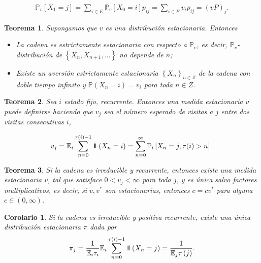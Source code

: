 \documentclass{article}
\newtheorem{Teo}{Teorema}[section]
\newtheorem{Cor}{Corolario}[section]
\newcommand{\esp}{\mathbb{E}}
\newcommand{\prob}{\mathbb{P}}
\newcommand{\indora}{\mbox{$1$\hspace{-0.8ex}$1$}}
\numberwithin{equation}{section}
\begin{document}
\begin{eqnarray}
\prob_{v}\left[X_{1}=j\right]=\sum_{i\in E}\prob_{v}\left[X_{0}=i\right]p_{ij}=\sum_{i\in E}v_{i}p_{ij}=\left(vP\right)_{j}.
\end{eqnarray}

\begin{Teo}
Supongamos que $v$ es una distribuci\'on estacionaria. Entonces
\begin{itemize}
\item[i)] La cadena es estrictamente estacionaria con respecto a
$\prob_{v}$, es decir, $\prob_{v}$-distribuci\'on de $\left\{X_{n},X_{n+1},\ldots\right\}$ no depende de $n$;
\item[ii)] Existe un aversi\'on estrictamente estacionaria $\left\{X_{n}\right\}_{n\in Z}$ de la cadena con doble tiempo infinito y $\prob\left(X_{n}=i\right)=v_{i}$ para toda $n\in Z$.
\end{itemize}
\end{Teo}

\begin{Teo}
Sea $i$ estado fijo, recurrente. Entonces una medida estacionaria $v$ puede definirse haciendo que $v_{j}$ sea el n\'umero esperado de visitas a $j$ entre dos visitas consecutivas $i$,

\begin{equation}\label{Eq.3.1}
v_{j}=\esp_{i}\sum_{n=0}^{\tau(i)-1}\indora\left(X_{n}=i\right)=\sum_{n=0}^{\infty}\prob_{i}\left[X_{n}=j,\tau(i)>n\right].
\end{equation}
\end{Teo}

\begin{Teo}\label{Teo.3.3}
Si la cadena es irreducible y recurrente, entonces existe una medida estacionaria $v$, tal que satisface $0<v_{j}<\infty$ para toda $j$, y es \'unica salvo factores multiplicativos, es decir, si $v,v^{*}$ son estacionarias, entonces $c=cv^{*}$ para alguna $c\in\left(0,\infty\right)$.
\end{Teo}

\begin{Cor}\label{Cor.3.5}
Si la cadena es irreducible y positiva recurrente, existe una \'unica distribuci\'on estacionaria $\pi$ dada por
\begin{equation}
\pi_{j}=\frac{1}{\esp_{i}\tau_{i}}\esp_{i}\sum_{n=0}^{\tau\left(i\right)-1}\indora\left(X_{n}=j\right)=\frac{1}{\esp_{j}\tau\left(j\right)}.
\end{equation}
\end{Cor}
\end{document}
